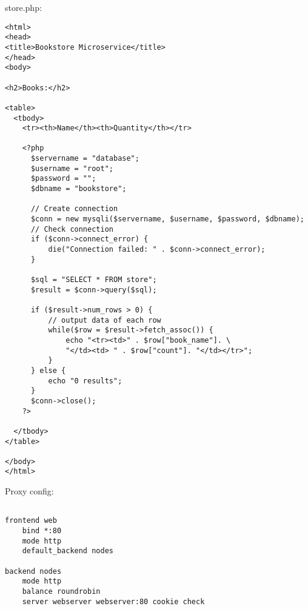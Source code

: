 store.php:

\begin{verbatim}
<html>
<head>
<title>Bookstore Microservice</title>
</head>
<body>

<h2>Books:</h2>

<table>
  <tbody>
    <tr><th>Name</th><th>Quantity</th></tr>

    <?php
      $servername = "database";
      $username = "root";
      $password = "";
      $dbname = "bookstore";

      // Create connection
      $conn = new mysqli($servername, $username, $password, $dbname);
      // Check connection
      if ($conn->connect_error) {
          die("Connection failed: " . $conn->connect_error);
      }

      $sql = "SELECT * FROM store";
      $result = $conn->query($sql);

      if ($result->num_rows > 0) {
          // output data of each row
          while($row = $result->fetch_assoc()) {
              echo "<tr><td>" . $row["book_name"]. \
              "</td><td> " . $row["count"]. "</td></tr>";
          }
      } else {
          echo "0 results";
      }
      $conn->close();
    ?>

  </tbody>
</table>

</body>
</html>
\end{verbatim}

Proxy config:

\begin{verbatim}

frontend web
    bind *:80
    mode http
    default_backend nodes

backend nodes
    mode http
    balance roundrobin
    server webserver webserver:80 cookie check
\end{verbatim}
